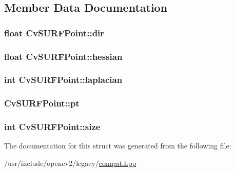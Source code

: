\subsection{Member Data Documentation}
\hypertarget{structCvSURFPoint_a08e42d76fd78454974c1a2ce38e05c53}{
\subsubsection[{dir}]{\setlength{\rightskip}{0pt plus 5cm}float Cv\-S\-U\-R\-F\-Point\-::dir}}\label{structCvSURFPoint_a08e42d76fd78454974c1a2ce38e05c53}
\hypertarget{structCvSURFPoint_ae24f023d123a23323684928d6bb423c6}{
\subsubsection[{hessian}]{\setlength{\rightskip}{0pt plus 5cm}float Cv\-S\-U\-R\-F\-Point\-::hessian}}\label{structCvSURFPoint_ae24f023d123a23323684928d6bb423c6}
\hypertarget{structCvSURFPoint_a584a2aa3e1c046b3e57b2a9c0d82c73d}{
\subsubsection[{laplacian}]{\setlength{\rightskip}{0pt plus 5cm}int Cv\-S\-U\-R\-F\-Point\-::laplacian}}\label{structCvSURFPoint_a584a2aa3e1c046b3e57b2a9c0d82c73d}
\hypertarget{structCvSURFPoint_a60dfd069a42d57a2259d862b14f287c1}{
\subsubsection[{pt}]{ Cv\-S\-U\-R\-F\-Point\-::pt}}\label{structCvSURFPoint_a60dfd069a42d57a2259d862b14f287c1}
\hypertarget{structCvSURFPoint_a0f46678907ba7a867a9eb2ade22a80eb}{
\subsubsection[{size}]{\setlength{\rightskip}{0pt plus 5cm}int Cv\-S\-U\-R\-F\-Point\-::size}}\label{structCvSURFPoint_a0f46678907ba7a867a9eb2ade22a80eb}


The documentation for this struct was generated from the following file\-:\begin{DoxyCompactItemize}
\item 
/usr/include/opencv2/legacy/\hyperlink{compat_8hpp}{compat.\-hpp}\end{DoxyCompactItemize}
